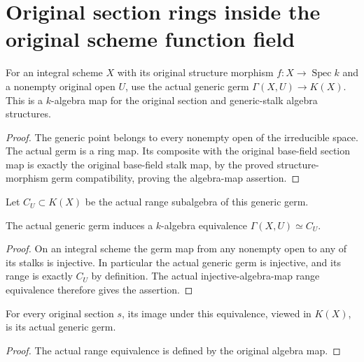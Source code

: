 \section{Original section rings inside the original scheme function field}

\begin{definition}\label{def:sc0-scheme-sections-function-field-map}
\leanok
For an integral scheme $X$ with its original structure morphism
$f:X\to\operatorname{Spec} k$ and a nonempty original open $U$, use
the actual generic germ $\Gamma(X,U)\to K(X)$. This is a $k$-algebra
map for the original section and generic-stalk algebra structures.
\end{definition}
\begin{proof}
The generic point belongs to every nonempty open of the irreducible
space. The actual germ is a ring map. Its composite with the original
base-field section map is exactly the original base-field stalk map,
by the proved structure-morphism germ compatibility, proving the
algebra-map assertion.
\end{proof}

\begin{definition}\label{def:sc0-scheme-sections-function-field-subalgebra}
\leanok
{}
Let $C_U\subset K(X)$ be the actual range subalgebra of this generic germ.
\end{definition}

\begin{theorem}\label{thm:sc0-scheme-sections-function-field-equiv}
\leanok
{}
The actual generic germ induces a $k$-algebra equivalence
$\Gamma(X,U)\simeq C_U$.
\end{theorem}
\begin{proof}
On an integral scheme the germ map from any nonempty open to any
of its stalks is injective. In particular the actual generic germ is
injective, and its range is exactly $C_U$ by definition. The actual
injective-algebra-map range equivalence therefore gives the assertion.
\end{proof}

\begin{theorem}\label{thm:sc0-scheme-sections-function-field-equiv-apply}
\leanok
{}
For every original section $s$, its image under this equivalence,
viewed in $K(X)$, is its actual generic germ.
\end{theorem}
\begin{proof}
The actual range equivalence is defined by the original algebra map.
\end{proof}

